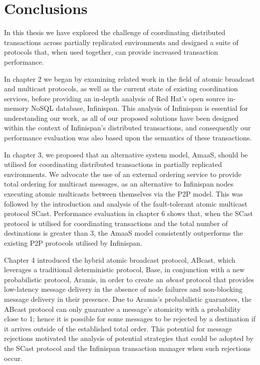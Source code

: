 \chapter{Conclusions}

    \graphicspath{{Chapter7-Conclusions/Figs/Vector/}{Chapter3-Conclusions/Figs/}}

In this thesis we have explored the challenge of coordinating distributed transactions across partially replicated environments and designed a suite of protocols that, when used together, can provide increased transaction performance. 

In chapter 2 we began by examining related work in the field of atomic broadcast and multicast protocols, as well as the current state of existing coordination services, before providing an in-depth analysis of Red Hat's open source in-memory NoSQL database, Infinispan.  This analysis of Infinispan is essential for understanding our work, as all of our proposed solutions have been designed within the context of Infinispan's distributed transactions, and consequently our performance evaluation was also based upon the semantics of these transactions.  

In chapter 3, we proposed that an alternative system model, \textsf{AmaaS}, should be utilised for coordinating distributed transactions in partially replicated environments.  We advocate the use of an external ordering service to provide total ordering for multicast messages, as an alternative to Infinispan nodes executing atomic multicasts between themselves via the P2P model.  This was followed by the introduction and analysis of the fault-tolerant atomic multicast protocol \textsf{SCast}.  Performance evaluation in chapter 6 shows that, when the \textsf{SCast} protocol is utilised for coordinating transactions and the total number of destinations is greater than 3, the \textsf{AmaaS} model consistently outperforms the existing P2P protocols utilised by Infinispan.

Chapter 4 introduced the hybrid atomic broadcast protocol, \textsf{ABcast}, which leverages a traditional deterministic protocol, \textsf{Base}, in conjunction with a new probabilistic protocol, \textsf{Aramis}, in order to create an \emph{abcast} protocol that provides low-latency message delivery in the absence of node failures and non-blocking message delivery in their presence.  Due to \textsf{Aramis}'s probabilistic guarantees, the \textsf{ABcast} protocol can only guarantee a message's atomicity with a probability close to 1; hence it is possible for some messages to be rejected by a destination if it arrives outside of the established total order.  This potential for message rejections motivated the analysis of potential strategies that could be adopted by the \textsf{SCast} protocol and the Infinispan transaction manager when such rejections occur.  


